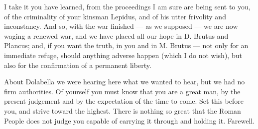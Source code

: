 

 I take it you have learned, from the proceedings I am sure are being sent to you, of the criminality of your kinsman Lepidus, and of his utter frivolity and inconstancy. And so, with the war finished --- as we supposed --- we are now waging a renewed war, and we have placed all our hope in D. Brutus and Plancus; and, if you want the truth, in you and in M. Brutus --- not only for an immediate refuge, should anything adverse happen (which I do not wish), but also for the confirmation of a permanent liberty.

 About Dolabella we were hearing here what we wanted to hear, but we had no firm authorities. Of yourself you must know that you are a great man, by the present judgement and by the expectation of the time to come. Set this before you, and strive toward the highest. There is nothing so great that the Roman People does not judge you capable of carrying it through and holding it. Farewell.
